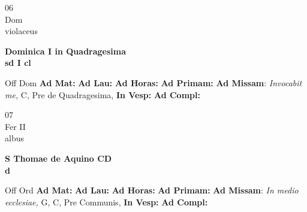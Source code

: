 \documentclass[10pt, openany]{book}
\begin{document}
        \begin{center}
            \begin{minipage}{3.5in}
                \vspace{2em}
                \begin{minipage}{0.5in}
                    {\Huge 06} \\
                    {\normalsize Dom} \\
                    {\normalsize violaceus}
                \end{minipage}
                \begin{minipage}{3.0in}
                    \textbf{ \large Dominica I in Quadragesima \\
                    \textnormal{\normalsize sd I cl}} \\ 
                \end{minipage}
                \begin{justify}Off Dom
                    \textbf{Ad Mat: }
                    \textbf{Ad Lau: }
                    \textbf{Ad Horas: }
                    \textbf{Ad Primam: }\textbf{Ad Missam}: \textit{Invocabit me,} C, Pre de Quadragesima,  
                    \textbf{In Vesp: }
                    \textbf{Ad Compl: }
                \end{justify}
            \end{minipage}
        \end{center}
    
        \begin{center}
            \begin{minipage}{3.5in}
                \vspace{2em}
                \begin{minipage}{0.5in}
                    {\Huge 07} \\
                    {\normalsize Fer II} \\
                    {\normalsize albus}
                \end{minipage}
                \begin{minipage}{3.0in}
                    \textbf{ \large S Thomae de Aquino CD \\
                    \textnormal{\normalsize d}} \\ 
                \end{minipage}
                \begin{justify}Off Ord
                    \textbf{Ad Mat: }
                    \textbf{Ad Lau: }
                    \textbf{Ad Horas: }
                    \textbf{Ad Primam: }\textbf{Ad Missam}: \textit{In medio ecclesiae,} G, C, Pre Communis,  
                    \textbf{In Vesp: }
                    \textbf{Ad Compl: }
                \end{justify}
            \end{minipage}
        \end{center}
    
\end{document}

